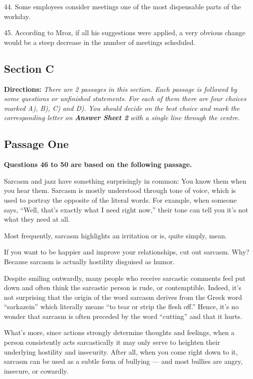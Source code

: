 \documentclass[UTF8,11pt]{ctexart}
\begin{document}
44. Some employees consider meetings one of the most dispensable parts of the workday.


45. According to Mroz, if all his suggestions were applied, a very obvious change would be a steep decrease in the number of meetings scheduled.


\subsection*{\textbf{Section C}}


\textbf{Directions: }\textit{There are 2 passages in this section. Each passage is followed by some questions or unfinished statements.} \textit{For each of them there are four choices marked A), B), C) and D). You should decide on the best choice and mark the} \textit{corresponding letter on }\textbf{\textit{Answer Sheet 2}}\textit{ with a single line through the centre.}


\subsection*{\textbf{Passage One}}


\textbf{Questions 46 to 50 are based on the following passage.}


Sarcasm and jazz have something surprisingly in common: You know them when you hear them. Sarcasm is mostly understood through tone of voice, which is used to portray the opposite of the literal words. For example, when someone says, “Well, that’s exactly what I need right now,” their tone can tell you it’s not what they need at all.


Most frequently, sarcasm highlights an irritation or is, quite simply, mean.


If you want to be happier and improve your relationships, cut out sarcasm. Why? Because sarcasm is actually hostility disguised as humor.


Despite smiling outwardly, many people who receive sarcastic comments feel put down and often think the sarcastic person is rude, or contemptible. Indeed, it’s not surprising that the origin of the word sarcasm derives from the Greek word “sarkazein” which literally means “to tear or strip the flesh off.” Hence, it’s no wonder that sarcasm is often preceded by the word “cutting” and that it hurts.


What’s more, since actions strongly determine thoughts and feelings, when a person consistently acts sarcastically it may only serve to heighten their underlying hostility and insecurity. After all, when you come right down to it, sarcasm can be used as a subtle form of bullying — and most bullies are angry, insecure, or cowardly.
\end{document}
